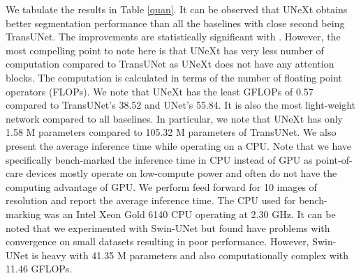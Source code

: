 \documentclass[runningheads]{llncs}
\begin{document}
We tabulate the results in Table \ref{quan}. It can be observed that UNeXt obtains better segmentation performance than all the  baselines with close second being TransUNet. The  improvements are statistically significant with . However, the most compelling point to note here is that UNeXt has very less number of computation compared to TransUNet as UNeXt does not have any attention blocks. The computation is calculated in terms of the number of floating point operators (FLOPs). We note that UNeXt has the least GFLOPs of 0.57 compared to TransUNet's 38.52 and UNet's 55.84.  It is also the most light-weight network compared to all baselines. In particular, we note that UNeXt has only 1.58 M parameters compared to 105.32 M parameters of TransUNet. We also present the average inference time while operating on a CPU. Note that we have specifically bench-marked the inference time in CPU instead of GPU as point-of-care devices mostly operate on low-compute power and often do not have the computing advantage of GPU.  We perform feed forward for 10 images of resolution  and report the average inference time. The CPU used for bench-marking was an Intel Xeon Gold 6140 CPU operating at 2.30 GHz. It can be noted that we experimented with Swin-UNet \cite{cao2021swin} but found have problems with convergence on small datasets resulting in poor performance. However, Swin-UNet is heavy with 41.35 M parameters and also computationally complex with 11.46 GFLOPs.  
\end{document}
